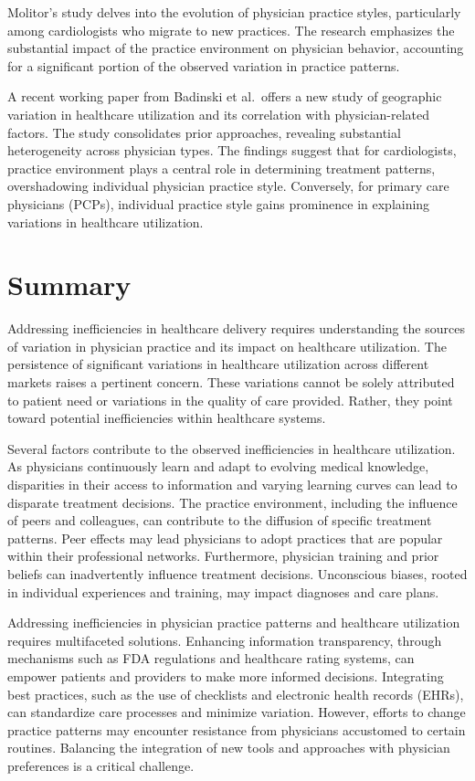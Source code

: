 \documentclass[
  letterpaper,
  DIV=11,
  numbers=noendperiod]{scrreport}
\theoremstyle{definition}
\theoremstyle{remark}
\begin{document}
Molitor's study delves into the evolution of physician practice styles,
particularly among cardiologists who migrate to new practices. The
research emphasizes the substantial impact of the practice environment
on physician behavior, accounting for a significant portion of the
observed variation in practice patterns.

A recent working paper from Badinski et al.~offers a new study of
geographic variation in healthcare utilization and its correlation with
physician-related factors. The study consolidates prior approaches,
revealing substantial heterogeneity across physician types. The findings
suggest that for cardiologists, practice environment plays a central
role in determining treatment patterns, overshadowing individual
physician practice style. Conversely, for primary care physicians
(PCPs), individual practice style gains prominence in explaining
variations in healthcare utilization.

\hypertarget{summary}{%
\section{Summary}\label{summary}}

Addressing inefficiencies in healthcare delivery requires understanding
the sources of variation in physician practice and its impact on
healthcare utilization. The persistence of significant variations in
healthcare utilization across different markets raises a pertinent
concern. These variations cannot be solely attributed to patient need or
variations in the quality of care provided. Rather, they point toward
potential inefficiencies within healthcare systems.

Several factors contribute to the observed inefficiencies in healthcare
utilization. As physicians continuously learn and adapt to evolving
medical knowledge, disparities in their access to information and
varying learning curves can lead to disparate treatment decisions. The
practice environment, including the influence of peers and colleagues,
can contribute to the diffusion of specific treatment patterns. Peer
effects may lead physicians to adopt practices that are popular within
their professional networks. Furthermore, physician training and prior
beliefs can inadvertently influence treatment decisions. Unconscious
biases, rooted in individual experiences and training, may impact
diagnoses and care plans.

Addressing inefficiencies in physician practice patterns and healthcare
utilization requires multifaceted solutions. Enhancing information
transparency, through mechanisms such as FDA regulations and healthcare
rating systems, can empower patients and providers to make more informed
decisions. Integrating best practices, such as the use of checklists and
electronic health records (EHRs), can standardize care processes and
minimize variation. However, efforts to change practice patterns may
encounter resistance from physicians accustomed to certain routines.
Balancing the integration of new tools and approaches with physician
preferences is a critical challenge.
\end{document}
